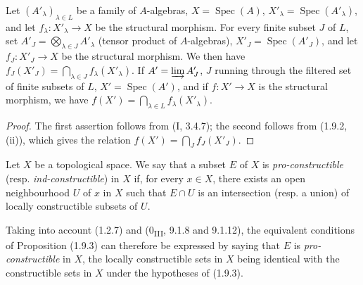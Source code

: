 \begin{lemma}[1.9.3.2]
\label{IV.1.9.3.2}
Let $(A'_\lambda)_{\lambda\in L}$ be a family of $A$-algebras,
$X=\operatorname{Spec}(A)$, $X'_\lambda=\operatorname{Spec}(A'_\lambda)$,
and let $f_\lambda:X'_\lambda\to X$ be the structural morphism. For every
finite subset $J$ of $L$, set
$A'_J=\bigotimes_{\lambda\in J}A'_\lambda$ (tensor product of
$A$-algebras), $X'_J=\operatorname{Spec}(A'_J)$, and let $f_J:X'_J\to X$ be
the structural morphism. We then have
$f_J(X'_J)=\bigcap_{\lambda\in J}f_\lambda(X'_\lambda)$. If
$A'=\varinjlim A'_J$, $J$ running through the filtered set of finite subsets
of $L$, $X'=\operatorname{Spec}(A')$, and if $f:X'\to X$ is the
structural morphism, we have
$f(X')=\bigcap_{\lambda\in L}f_\lambda(X'_\lambda)$.
\end{lemma}

\begin{proof}
The first assertion follows from (I, 3.4.7); the second follows from (1.9.2,
(ii)), which gives the relation $f(X')=\bigcap_Jf_J(X'_J)$.
\end{proof}

\begin{definition}[1.9.4]
\label{IV.1.9.4}
Let $X$ be a topological space. We say that a subset $E$ of $X$ is
\emph{pro-constructible} (resp. \emph{ind-constructible}) in $X$ if, for
every $x\in X$, there exists an open neighbourhood $U$ of $x$ in $X$ such that
$E\cap U$ is an intersection (resp. a union) of locally constructible subsets
of $U$.
\end{definition}

Taking into account (1.2.7) and (0\textsubscript{III}, 9.1.8 and 9.1.12), the
equivalent conditions of Proposition (1.9.3) can therefore be expressed by
saying that $E$ is \emph{pro-constructible} in $X$, the locally constructible
sets in $X$ being identical with the constructible sets in $X$ under the
hypotheses of (1.9.3).


